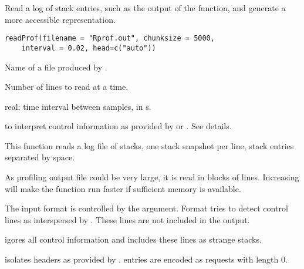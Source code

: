 \documentclass[a4paper]{book}
\begin{document}
%
\begin{Description}\relax
Read a log of stack entries, such as the output of the  function, and generate a more accessible representation.
\end{Description}
%
\begin{Usage}
\begin{verbatim}
readProf(filename = "Rprof.out", chunksize = 5000,
	interval = 0.02, head=c("auto"))
\end{verbatim}
\end{Usage}
%
\begin{Arguments}
\begin{ldescription}
\item[\code{filename}] Name of a file produced by .
\item[\code{chunksize}] Number of lines to read at a time.
\item[\code{interval}] real: time interval between samples, in s.
\item[\code{head}]  to interpret control information as provided by  or . See details.
\end{ldescription}
\end{Arguments}
%
\begin{Details}\relax
This function reads a log file of stacks, one stack snapshot per line, stack entries separated by space.

As profiling output file could be very large, it
is read in blocks of  lines.  Increasing 
will make the function run faster if sufficient memory is available.

The input format is controlled by the  argument. Format  tries to detect control lines as interspersed by . These lines are not included in the output.

 igores all control information and includes these lines as strange stacks.  

 isolates headers as provided by  .  entries are encoded as  requests with length 0.
\end{Details}
%
\end{document}
